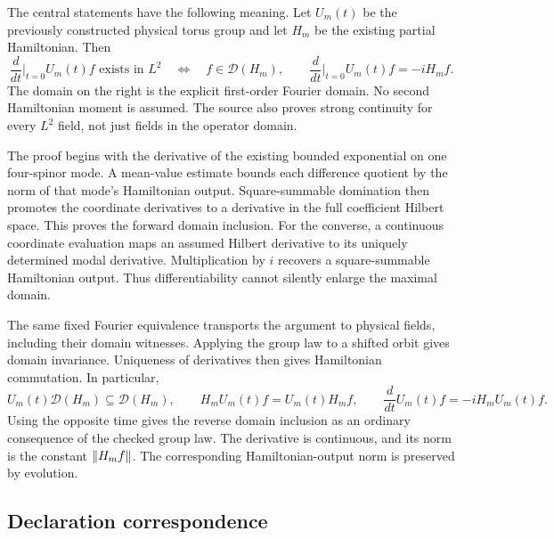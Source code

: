 The central statements have the following meaning. Let $U_m(t)$ be the previously constructed physical torus group and let $H_m$ be the existing partial Hamiltonian. Then
\[
 \frac{d}{dt}\bigg|_{t=0} U_m(t)f\text{ exists in }L^2
 \quad\Longleftrightarrow\quad f\in\mathcal D(H_m),
 \qquad
 \frac{d}{dt}\bigg|_{t=0}U_m(t)f=-iH_mf.
\]
The domain on the right is the explicit first-order Fourier domain. No second Hamiltonian moment is assumed. The source also proves strong continuity for every $L^2$ field, not just fields in the operator domain.

The proof begins with the derivative of the existing bounded exponential on one four-spinor mode. A mean-value estimate bounds each difference quotient by the norm of that mode's Hamiltonian output. Square-summable domination then promotes the coordinate derivatives to a derivative in the full coefficient Hilbert space. This proves the forward domain inclusion. For the converse, a continuous coordinate evaluation maps an assumed Hilbert derivative to its uniquely determined modal derivative. Multiplication by $i$ recovers a square-summable Hamiltonian output. Thus differentiability cannot silently enlarge the maximal domain.

The same fixed Fourier equivalence transports the argument to physical fields, including their domain witnesses. Applying the group law to a shifted orbit gives domain invariance. Uniqueness of derivatives then gives Hamiltonian commutation. In particular,
\[
 U_m(t)\mathcal D(H_m)\subseteq\mathcal D(H_m),\qquad
 H_mU_m(t)f=U_m(t)H_mf,\qquad
 \frac{d}{dt}U_m(t)f=-iH_mU_m(t)f.
\]
Using the opposite time gives the reverse domain inclusion as an ordinary consequence of the checked group law. The derivative is continuous, and its norm is the constant $\left\lVert H_mf\right\rVert$. The corresponding Hamiltonian-output norm is preserved by evolution.

\subsection{Declaration correspondence}

